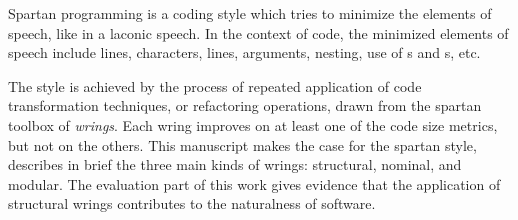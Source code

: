 
Spartan programming is a coding  style which tries to minimize the elements of
speech, like in a laconic speech.
In the context of code, the minimized elements of speech include 
lines, characters, lines, arguments, nesting, use of s and
s, etc.  

The style is achieved by the process of repeated application of code
transformation techniques, or refactoring operations, drawn from the spartan
toolbox of \emph{wrings}.  Each wring improves on at least one of the code size
metrics, but not on the others.  This manuscript makes the case for the spartan
style, describes in brief 
the three main kinds of wrings: structural, nominal, and modular. 
The evaluation part of this work gives evidence that the application of
structural wrings contributes to the naturalness of software. 


